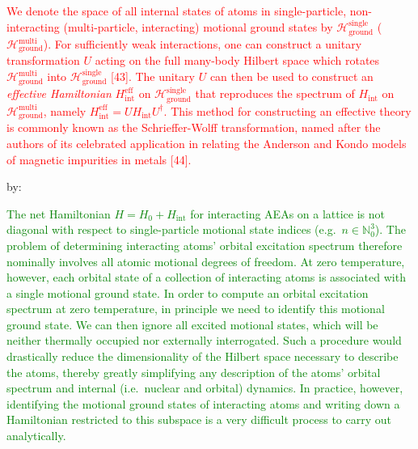 \documentclass[preprint,showkeys,nofootinbib]{revtex4-1}
\renewcommand{\t}{\text} %
\renewcommand{\H}{\mathcal{H}}
\newcommand{\1}{\mathds{1}}
\newcommand{\red}[1]{\textcolor{red}{#1}}
\newcommand{\green}[1]{\textcolor{green}{#1}}
\newcounter{point}
\begin{document}
\begin{enumerate}[label=(R1.\arabic{point}.\arabic*)]
  \red{We denote the space of all internal states of atoms in
    single-particle, non-interacting (multi-particle, interacting)
    motional ground states by $\H_{\t{ground}}^{\t{single}}$
    ($\H_{\t{ground}}^{\t{multi}}$).  For sufficiently weak
    interactions, one can construct a unitary transformation $U$
    acting on the full many-body Hilbert space which rotates
    $\H_{\t{ground}}^{\t{multi}}$ into $\H_{\t{ground}}^{\t{single}}$
    [43].  The unitary $U$ can then be used to construct an {\it
      effective Hamiltonian} $H_{\t{int}}^{\t{eff}}$ on
    $\H_{\t{ground}}^{\t{single}}$ that reproduces the spectrum of
    $H_{\t{int}}$ on $\H_{\t{ground}}^{\t{multi}}$, namely
    $H_{\t{int}}^{\t{eff}}=UH_{\t{int}}U^\dag$.  This method for
    constructing an effective theory is commonly known as the
    Schrieffer-Wolff transformation, named after the authors of its
    celebrated application in relating the Anderson and Kondo models
    of magnetic impurities in metals [44].}

  by:

  \green{The net Hamiltonian $H = H_0 + H_{\t{int}}$ for interacting
    AEAs on a lattice is not diagonal with respect to single-particle
    motional state indices (e.g.~$n\in\mathbb{N}_0^3$).  The problem
    of determining interacting atoms' orbital excitation spectrum
    therefore nominally involves all atomic motional degrees of
    freedom.  At zero temperature, however, each orbital state of a
    collection of interacting atoms is associated with a single
    motional ground state.  In order to compute an orbital excitation
    spectrum at zero temperature, in principle we need to identify
    this motional ground state.  We can then ignore all excited
    motional states, which will be neither thermally occupied nor
    externally interrogated.  Such a procedure would drastically
    reduce the dimensionality of the Hilbert space necessary to
    describe the atoms, thereby greatly simplifying any description of
    the atoms' orbital spectrum and internal (i.e.~nuclear and
    orbital) dynamics.  In practice, however, identifying the motional
    ground states of interacting atoms and writing down a Hamiltonian
    restricted to this subspace is a very difficult process to carry
    out analytically.}


\end{enumerate}
\end{document}
